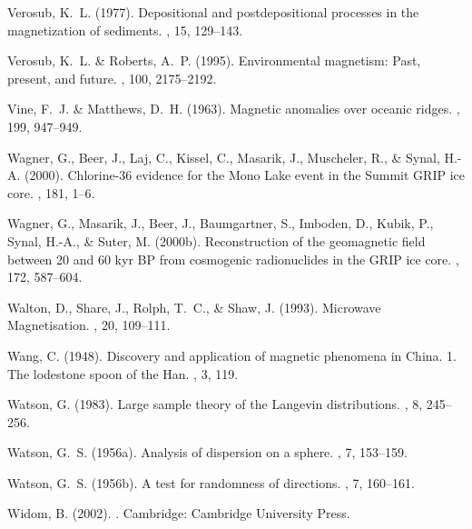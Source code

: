 \documentclass[11pt]{book}
\begin{document}
\begin{thebibliography}{}
Verosub, K.~L. (1977).
\newblock Depositional and postdepositional processes in the magnetization of
  sediments.
, 15, 129--143.

Verosub, K.~L. \& Roberts, A.~P. (1995).
\newblock Environmental magnetism: Past, present, and future.
, 100, 2175--2192.

Vine, F.~J. \& Matthews, D.~H. (1963).
\newblock Magnetic anomalies over oceanic ridges.
, 199, 947--949.

Wagner, G., Beer, J., Laj, C., Kissel, C., Masarik, J., Muscheler, R., \&
  Synal, H.-A. (2000).
\newblock Chlorine-36 evidence for the Mono Lake event in the Summit GRIP ice
  core.
, 181, 1--6.

Wagner, G., Masarik, J., Beer, J., Baumgartner, S., Imboden, D., Kubik, P.,
  Synal, H.-A., \& Suter, M. (2000b).
\newblock Reconstruction of the geomagnetic field between 20 and 60 kyr BP from
  cosmogenic radionuclides in the GRIP ice core.
, 172, 587--604.

Walton, D., Share, J., Rolph, T.~C., \& Shaw, J. (1993).
\newblock Microwave Magnetisation.
, 20, 109--111.

Wang, C. (1948).
\newblock Discovery and application of magnetic phenomena in China. 1. The
  lodestone spoon of the Han.
, 3, 119.

Watson, G. (1983).
\newblock Large sample theory of the Langevin distributions.
, 8, 245--256.

Watson, G.~S. (1956a).
\newblock Analysis of dispersion on a sphere.
, 7, 153--159.

Watson, G.~S. (1956b).
\newblock A test for randomness of directions.
, 7, 160--161.

Widom, B. (2002).
.
\newblock Cambridge: Cambridge University Press.


\end{thebibliography}
\end{document}
